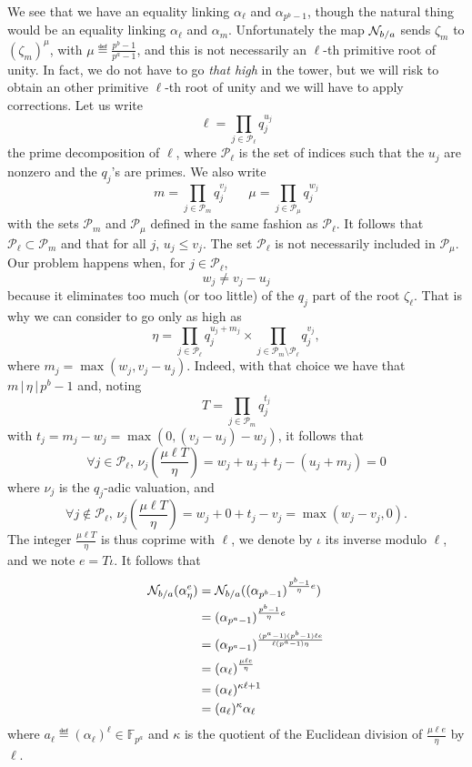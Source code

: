 \documentclass[a4paper,11pt]{article}
\begin{document}
We see that we have an equality linking $\alpha_\ell$ and
$\alpha_{p^b-1}$, though the natural thing would be an
equality linking $\alpha_\ell$ and $\alpha_m$. Unfortunately the map
$\mathcal N_{b/a}$ sends $\zeta_{m}$ to
$(\zeta_{m})^{\mu}$, with $\mu\eqdef\frac{p^b-1}{p^a-1}$,
and this is not necessarily an $\ell$-th primitive root of unity.
In fact, we do not have to go \emph{that high} in the tower, but we will risk to
obtain an other primitive $\ell$-th root of unity and we will have to apply
corrections. Let us write
\[
  \ell=\prod_{j\in\mathcal P_\ell}q_j^{u_j}
\]
the prime decomposition of $\ell$, where $\mathcal P_\ell$ is the set of indices
such that the $u_j$ are nonzero and the $q_j$'s are primes. We also write
\[
  m=\prod_{j\in\mathcal P_m}q_j^{v_j}\phantom{and}
  \mu=\prod_{j\in\mathcal P_\mu}q_j^{w_j}
\]
with the sets $\mathcal P_m$ and $\mathcal P_\mu$ defined in the same fashion as
$\mathcal P_\ell$. It follows that $\mathcal P_\ell\subset\mathcal P_m$ and that for all
$j$, $u_j\leq v_j$. The set $\mathcal P_\ell$ is not
necessarily included in $\mathcal P_\mu$. Our problem happens when, for $j\in\mathcal
P_\ell$,
\[
  w_j\neq v_j-u_j
\]
because it eliminates too much (or too little) of the $q_j$ part of the root $\zeta_\ell$. That
is why we can consider to go only as high as 
\[
  \eta=\prod_{j\in\mathcal
  P_\ell}q_j^{u_j+m_j}\times\prod_{j\in\mathcal P_m\setminus \mathcal
  P_\ell}q_j^{v_j},
\]
where $ m_j = \max(w_j, v_j-u_j)$.
Indeed, with that choice we have that $m\,|\,\eta\,|\,p^b-1$ and, noting
\[
  T = \prod_{j\in\mathcal P_m}q_j^{t_j}
\]
with $t_j = m_j-w_j = \max(0, (v_j-u_j)-w_j)$, it follows that
\[
  \forall j\in\mathcal P_\ell,\, \nu_{j}(\frac{\mu\ell T}{\eta}) = w_j + u_j +
  t_j - (u_j + m_j) = 0
\]
where $\nu_j$ is the $q_j$-adic valuation, and
\[
  \forall j\notin \mathcal P_\ell,\,\nu_j(\frac{\mu\ell T}{\eta}) = w_j + 0 +
  t_j - v_j = \max(w_j-v_j, 0).
\]
The integer $\frac{\mu\ell T}{\eta}$ is thus coprime with $\ell$, we denote
by $\iota$ its inverse modulo $\ell$, and we note $e=T\iota$. It follows that
\begin{align*}
  \mathcal N_{b/a}(\alpha_\eta^e) &= \mathcal N_{b/a}((\alpha_{p^b-1})^{\frac{p^b-1}{\eta}e})\\
  &= (\alpha_{p^a-1})^{\frac{p^b-1}{\eta}e}\\
  &= (\alpha_{p^a-1})^{\frac{(p^a-1)(p^b-1)\ell e}{\ell(p^a-1)\eta}}\\
  &= (\alpha_\ell)^{\frac{\mu\ell e}{\eta}}\\
  &= (\alpha_\ell)^{\kappa\ell+1}\\
  &= (a_\ell)^\kappa\alpha_\ell
\end{align*}
where $a_\ell\eqdef(\alpha_{\ell})^\ell\in\mathbb{F}_{p^a}$ and $\kappa$ is the
quotient of the Euclidean division of $\frac{\mu\ell e}{\eta}$ by $\ell$.
\end{document}
